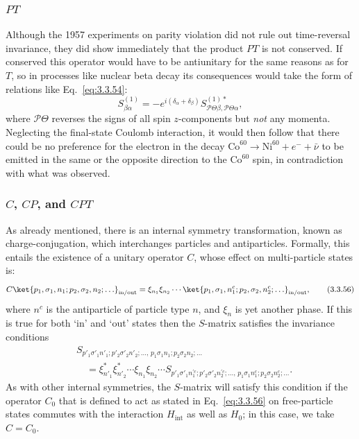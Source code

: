\subsubsection*{$PT$}

Although the 1957 experiments on parity violation did not rule out time-reversal
invariance, they did show immediately that the product $PT$ is not conserved. If
conserved this operator would have to be antiunitary for the same reasons as for
$T$, so in processes like nuclear beta decay its consequences would take the form
of relations like Eq.~\eqref{eq:3.3.54}:
\[
S^{(1)}_{\beta\alpha}
=-e^{i(\delta_\alpha+\delta_\beta)}
S^{(1)*}_{\mathcal{P}\Theta\beta,\mathcal{P}\Theta\alpha},
\]
where $\mathcal{P}\Theta$ reverses the signs of all spin $z$-components but
\textit{not} any momenta. Neglecting the final-state Coulomb interaction, it would
then follow that there could be no preference for the electron in the decay
$\mathrm{Co}^{60}\to\mathrm{Ni}^{60}+e^-+\bar\nu$ to be emitted in the same or the
opposite direction to the $\mathrm{Co}^{60}$ spin, in contradiction with what was
observed.

\subsubsection*{$C$, $CP$, and $CPT$}

As already mentioned, there is an internal symmetry transformation, known as
charge-conjugation, which interchanges particles and antiparticles. Formally, this
entails the existence of a unitary operator $C$, whose effect on multi-particle
states is:
\begin{equation}
C\ket{p_1,\sigma_1,n_1;p_2,\sigma_2,n_2;\ldots}_{\mathrm{in/out}}
=\xi_{n_1}\xi_{n_2}\cdots
\ket{p_1,\sigma_1,n_1^c;p_2,\sigma_2,n_2^c;\ldots}_{\mathrm{in/out}},
\tag{3.3.56}\label{eq:3.3.56}
\end{equation}
where $n^c$ is the antiparticle of particle type $n$, and $\xi_n$ is yet another
phase. If this is true for both `in' and `out' states then the $S$-matrix satisfies
the invariance conditions
\begin{align}
&S_{p'_1\sigma'_1n'_1;p'_2\sigma'_2n'_2;\ldots,\,
p_1\sigma_1n_1;p_2\sigma_2n_2;\ldots}
\nonumber\\
&\quad=\xi^*_{n'_1}\xi^*_{n'_2}\cdots\xi_{n_1}\xi_{n_2}\cdots
S_{p'_1\sigma'_1n_1^{\prime c};p'_2\sigma'_2n_2^{\prime c};\ldots,\,
p_1\sigma_1n_1^c;p_2\sigma_2n_2^c;\ldots}.
\tag{3.3.57}\label{eq:3.3.57}
\end{align}
As with other internal symmetries, the $S$-matrix will satisfy this condition if the
operator $C_0$ that is defined to act as stated in Eq.~\eqref{eq:3.3.56} on free-particle
states commutes with the interaction $H_{\mathrm{int}}$ as well as $H_0$; in this
case, we take $C=C_0$.

